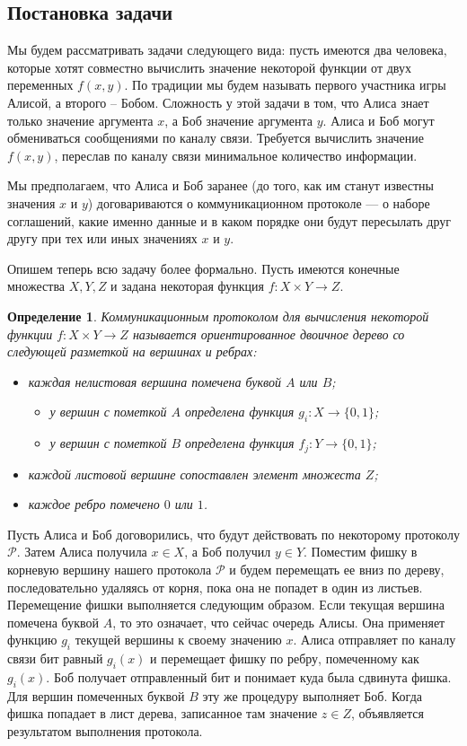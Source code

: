 \documentclass[a4paper]{article}
\newtheorem*{mdefinition}{Определение}
\begin{document}
\subsection{Постановка задачи}
Мы будем рассматривать задачи следующего вида: пусть имеются два человека, которые хотят совместно
вычислить значение некоторой функции от двух переменных $f(x, y)$. По традиции мы будем называть
первого участника игры Алисой, а второго -- Бобом. Сложность у этой задачи в том, что Алиса знает только
значение аргумента $x$, а Боб значение аргумента $y$. Алиса и Боб могут обмениваться сообщениями 
по каналу связи. Требуется вычислить значение $f(x, y)$, переслав по каналу связи минимальное
количество информации.

Мы предполагаем, что Алиса и Боб заранее (до того, как им станут известны значения $x$ и $y$)
договариваются о коммуникационном протоколе --- о наборе соглашений, какие именно данные и
в каком порядке они будут пересылать друг другу при тех или иных значениях $x$ и $y$.

Опишем теперь всю задачу более формально. Пусть имеются конечные множества $X, Y, Z$ и задана
некоторая функция $f:X\times Y\rightarrow Z$.

\begin{mdefinition}
    Коммуникационным протоколом для вычисления некоторой функции $f:X\times Y\rightarrow Z$ называется
    ориентированное двоичное дерево со следующей разметкой на вершинах и ребрах:
    \begin{itemize}[noitemsep]
        \item каждая нелистовая вершина помечена буквой $A$ или $B$;
        \begin{itemize}[noitemsep]
			\item у вершин с пометкой $A$ определена функция $g_i:X\rightarrow \{0,1\}$;
			\item у вершин с пометкой $B$ определена функция $f_j:Y\rightarrow \{0,1\}$;
        \end{itemize}
        \item каждой листовой вершине сопоставлен элемент множеста $Z$;
        \item каждое ребро помечено $0$ или $1$.

    \end{itemize}
\end{mdefinition}

Пусть Алиса и Боб договорились, что будут действовать по некоторому протоколу $\mathcal{P}$. Затем
Алиса получила $x\in X$, а Боб получил $y\in Y$. Поместим фишку в корневую вершину нашего протокола
$\mathcal{P}$ и будем перемещать ее вниз по дереву, последовательно удаляясь от корня,
пока она не попадет в один из листьев. Перемещение фишки выполняется следующим образом. Если текущая 
вершина помечена буквой $A$, то это означает, что сейчас очередь Алисы. Она применяет функцию $g_i$ текущей 
вершины к своему значению $x$. Алиса отправляет по каналу связи бит равный $g_i(x)$ и перемещает
фишку по ребру, помеченному как $g_i(x)$. Боб получает отправленный бит и понимает куда была сдвинута фишка.
Для вершин помеченных буквой $B$ эту же процедуру выполняет Боб. Когда фишка попадает в лист дерева,
записанное там значение $z\in Z$, объявляется результатом выполнения протокола.
\end{document}
